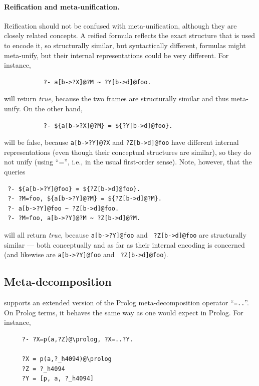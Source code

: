 \documentclass[11pt]{article}
\newcommand{\ERGO}{\mbox{\smaller{\ensuremath{\cal{E}}\smaller{{\sc{RGO}}}}}\xspace}
\newcommand{\FLSYSTEM}{\ERGO}
\begin{document}
\paragraph{Reification and meta-unification.}
Reification should not be confused with meta-unification, although they are
closely related concepts. A reified formula reflects the exact structure that is used
to encode it, so structurally similar, but syntactically different, formulas
might meta-unify, but their internal representations could be very different.
For instance, 
\begin{verbatim}
           ?- a[b->?X]@?M ~ ?Y[b->d]@foo.
\end{verbatim}
will return \emph{true}, because the two frames are structurally similar
and thus meta-unify. On the other hand,
\begin{verbatim}
           ?- ${a[b->?X]@?M} = ${?Y[b->d]@foo}.
\end{verbatim}
will be false, because {\tt a[b->?Y]@?X} and {\tt ?Z[b->d]@foo} have different
internal representations (even though their conceptual structures are
similar), so they do not unify (using ``='', i.e., in the usual
first-order sense). Note, however, that the queries
\begin{verbatim}
 ?- ${a[b->?Y]@foo} = ${?Z[b->d]@foo}.
 ?- ?M=foo, ${a[b->?Y]@?M} = ${?Z[b->d]@?M}.
 ?- a[b->?Y]@foo ~ ?Z[b->d]@foo.
 ?- ?M=foo, a[b->?Y]@?M ~ ?Z[b->d]@?M.
\end{verbatim}
will all return \emph{true}, because {\tt a[b->?Y]@foo} and {\tt
  ?Z[b->d]@foo} are structurally similar --- both conceptually and as far as
  their
internal encoding is concerned (and likewise are {\tt a[b->?Y]@foo} and {\tt
  ?Z[b->d]@foo}).

\subsection{Meta-decomposition}\label{sec-meta-decomp}

\FLSYSTEM supports an extended version of the Prolog meta-decomposition
operator ``{\tt =..}''. On Prolog terms, it behaves the same way as one
would expect in Prolog. For instance, 
\begin{verbatim}
     ?- ?X=p(a,?Z)@\prolog, ?X=..?Y.
 
     ?X = p(a,?_h4094)@\prolog
     ?Z = ?_h4094
     ?Y = [p, a, ?_h4094]
\end{verbatim}
\end{document}
